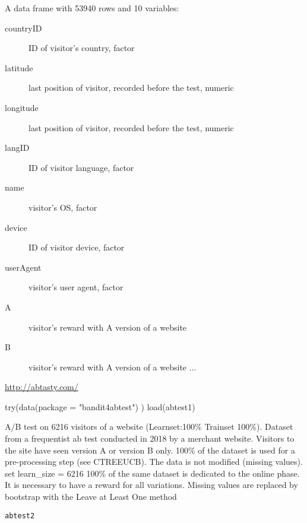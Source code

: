 \documentclass[letterpaper]{book}
\begin{document}
\begin{Format}
A data frame with 53940 rows and 10 variables:
\begin{description}

\item[countryID] ID of visitor's country, factor
\item[latitude] last position of visitor, recorded before the test, numeric
\item[longitude] last position of visitor, recorded before the test, numeric
\item[langID] ID of visitor language, factor
\item[name] visitor's OS, factor
\item[device] ID of visitor device, factor
\item[userAgent] visitor's user agent, factor
\item[A] visitor's reward with A version of a website
\item[B] visitor's reward with A version of a website
...

\end{description}
\end{Format}
%
\begin{Source}\relax
\url{http://abtasty.com/}
\end{Source}
%
\begin{Examples}
\begin{ExampleCode}
 try(data(package = "bandit4abtest") )
 load(abtest1)
\end{ExampleCode}
\end{Examples}
%
\begin{Description}\relax
A/B test on 6216 visitors of a website (Learnset:100\% Trainset 100\%).
Dataset from a frequentist ab test conducted in 2018 by a merchant website.
Visitors to the site have seen version A or version B only.
100\% of the dataset is used for a pre-processing step (see CTREEUCB).
The data is not modified (missing values).
set learn\_size = 6216
100\% of the same dataset is dedicated to the online phase.
It is necessary to have a reward for all variations.
Missing values are replaced by bootstrap with the Leave at Least One method
\end{Description}
%
\begin{Usage}
\begin{verbatim}
abtest2
\end{verbatim}
\end{Usage}
%
\end{document}
